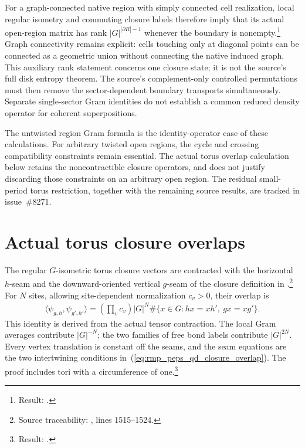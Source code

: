 \documentclass{article}
\begin{document}
For a graph-connected native region with simply connected cell
realization, local regular isometry and commuting closure labels
therefore imply that its actual open-region matrix has rank
$|G|^{|\partial R|-1}$ whenever the boundary is nonempty.\footnote{Result:
    .}
Graph
connectivity remains explicit: cells touching only at diagonal points
can be connected as a geometric union without connecting the native
induced graph. This auxiliary rank statement concerns one closure
state; it is not the source's full disk entropy theorem. The source's
complement-only controlled permutations must then remove the
sector-dependent boundary transports simultaneously. Separate
single-sector Gram identities do not establish a common reduced density
operator for coherent superpositions.

The untwisted region Gram formula is the identity-operator case of these
calculations. For arbitrary twisted open regions, the cycle and crossing
compatibility constraints remain essential. The actual torus overlap
calculation below retains the noncontractible closure operators, and
does not justify discarding those constraints on an arbitrary open region.
The residual small-period torus restriction, together with the
remaining source results, are tracked in issue~\#8271.

\section{Actual torus closure overlaps}
The regular $G$-isometric torus closure vectors are contracted with the
horizontal $h$-seam and the downward-oriented vertical $g$-seam of the
closure definition in \cite{Schuch2010PEPS}.\footnote{Source traceability:
    , lines 1515--1524.} For $N$ sites,
allowing site-dependent normalization $c_v>0$, their overlap is
\begin{align}
    \langle\psi_{g,h},\psi_{g',h'}\rangle
      =\left(\prod_v c_v\right)|G|^N
        \#\{x\in G:hx=xh',\ gx=xg'\}.
    \label{eq:rmp_peps_qd_closure_overlap}
\end{align}
This identity is derived from the actual tensor contraction. The local
Gram averages contribute $|G|^{-N}$; the two families of free bond
labels contribute $|G|^{2N}$. Every vertex translation is constant off
the seams, and the seam equations are the two intertwining
conditions in~(\ref{eq:rmp_peps_qd_closure_overlap}). The proof includes tori with a circumference of one.\footnote{Result:
    .}
\end{document}
